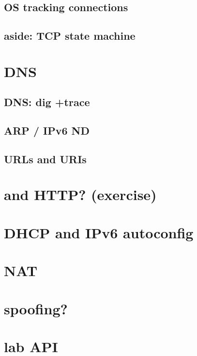 \subsection{OS tracking connections}


\subsection{aside: TCP state machine}

\section{DNS}


\subsection{DNS: dig +trace}


\subsection{ARP / IPv6 ND}


\subsection{URLs and URIs}


\section{and HTTP? (exercise)}


\section{DHCP and IPv6 autoconfig}


\section{NAT}



\section{spoofing?}



\section{lab API}

